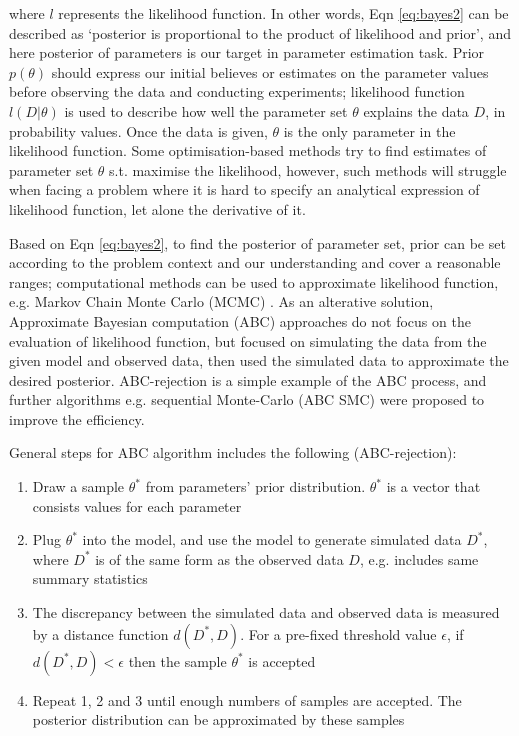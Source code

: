where $l$ represents the likelihood function. In other words, Eqn \ref{eq:bayes2} can be described as `posterior is proportional to the product of likelihood and prior', and here posterior of parameters is our target in parameter estimation task. Prior $p(\theta)$ should express our initial believes or estimates on the parameter values before observing the data and conducting experiments; likelihood function $l(D|\theta)$ is used to describe how well the parameter set $\theta$ explains the data $D$, in probability values. Once the data is given, $\theta$ is the only parameter in the likelihood function. Some optimisation-based methods try to find estimates of parameter set $\theta$ s.t. maximise the likelihood, however, such methods will struggle when facing a problem where it is hard to specify an analytical expression of likelihood function, let alone the derivative of it.

Based on Eqn \ref{eq:bayes2}, to find the posterior of parameter set, prior can be set according to the problem context and our understanding and cover a reasonable ranges; computational methods can be used to approximate likelihood function, e.g. Markov Chain Monte Carlo (MCMC) \cite{ref:MCMC}. As an alterative solution, Approximate Bayesian computation (ABC) approaches do not focus on the evaluation of likelihood function, but focused on simulating the data from the given model and observed data, then used the simulated data to approximate the desired posterior. ABC-rejection \cite{ABC_rejection} is a simple example of the ABC process, and further algorithms e.g. sequential Monte-Carlo (ABC SMC)\cite{Toni} were proposed to improve the efficiency.

General steps for ABC algorithm includes the following (ABC-rejection):

\begin{enumerate}
    \item Draw a sample $\theta^*$ from parameters' prior distribution. $\theta^*$ is a vector that consists values for each parameter
    \item Plug $\theta^*$ into the model, and use the model to generate simulated data $D^*$, where $D^*$ is of the same form as the observed data $D$, e.g. includes same summary statistics
    \item The discrepancy between the simulated data and observed data is measured by a distance function $d(D^*, D)$. For a pre-fixed threshold value $\epsilon$, if $d(D^*, D)<\epsilon$ then the sample $\theta^*$ is accepted
    \item Repeat 1, 2 and 3 until enough numbers of samples are accepted. The posterior distribution can be approximated by these samples
\end{enumerate}

